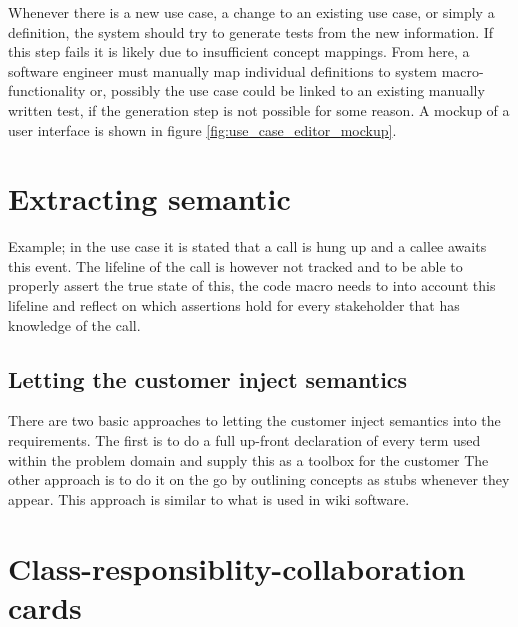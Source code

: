 Whenever there is a new use case, a change to an existing use case, or simply a definition, the system should try to generate tests from the new information. If this step fails it is likely due to insufficient concept mappings. From here, a software engineer must manually map individual definitions to system macro-functionality or, possibly the use case could be linked to an existing manually written test, if the generation step is not possible for some reason. A mockup of a user interface is shown in figure \ref{fig:use_case_editor_mockup}.


\section{Extracting semantic}
Example; in the use case it is stated that a call is hung up and a callee awaits this event. The lifeline of the call is however not tracked and to be able to properly assert the true state of this, the code macro needs to into account this lifeline and reflect on which assertions hold for every stakeholder that has knowledge of the call. %

\subsection{Letting the customer inject semantics}

There are two basic approaches to letting the customer inject semantics into the requirements. The first is to do a full up-front declaration of every term used within the problem domain and supply this as a toolbox for the customer %
The other approach is to do it on the go by outlining concepts as stubs whenever they appear. This approach is similar to what is used in wiki software. %

\section{Class-responsiblity-collaboration cards}


